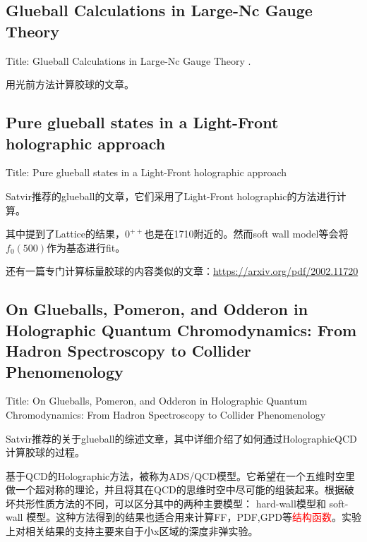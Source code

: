 \documentclass{article}
\begin{document}
\subsection{Glueball Calculations in Large-Nc Gauge Theory}

Title: Glueball Calculations in Large-Nc Gauge Theory \cite{Dalley_1999}.

用光前方法计算胶球的文章。






\subsection{Pure glueball states in a Light-Front holographic approach}

Title: Pure glueball states in a Light-Front holographic approach \cite{rinaldi2020pureglueballstateslightfront}

Satvir推荐的glueball的文章，它们采用了Light-Front holographic的方法进行计算。

其中提到了Lattice的结果，$0^{++}$也是在1710附近的。然而soft wall model等会将$f_0(500)$作为基态进行fit。

还有一篇专门计算标量胶球的内容类似的文章：\url{https://arxiv.org/pdf/2002.11720}









\subsection{On Glueballs, Pomeron, and Odderon in Holographic Quantum Chromodynamics: From Hadron Spectroscopy to Collider Phenomenology}

Title: On Glueballs, Pomeron, and Odderon in Holographic Quantum Chromodynamics: From Hadron Spectroscopy to Collider Phenomenology\cite{Hechenberger:2024imd}

Satvir推荐的关于glueball的综述文章，其中详细介绍了如何通过HolographicQCD计算胶球的过程。

基于QCD的Holographic方法，被称为ADS/QCD模型。它希望在一个五维时空里做一个超对称的理论，并且将其在QCD的思维时空中尽可能的组装起来。根据破坏共形性质方法的不同，可以区分其中的两种主要模型： hard-wall模型和 soft-wall 模型。这种方法得到的结果也适合用来计算FF，PDF,GPD等\textcolor{red}{结构函数}。实验上对相关结果的支持主要来自于小x区域的深度非弹实验。
\end{document}

